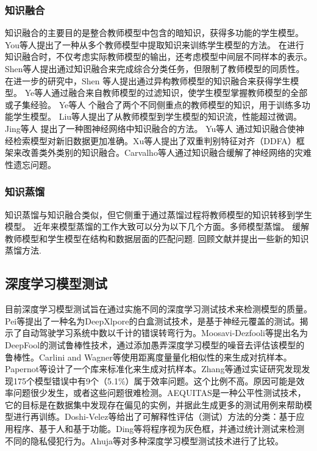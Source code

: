 \documentclass[fontset=macnew,UTF8]{article} %
\begin{document}
\subsubsection{知识融合}
知识融合的主要目的是整合教师模型中包含的暗知识，获得多功能的学生模型。 You等人\cite{you2017learning}提出了一种从多个教师模型中提取知识来训练学生模型的方法。 在进行知识融合时，不仅考虑实际教师模型的输出，还考虑模型中间层不同样本的表示。 Shen等人\cite{shen2019amalgamating}提出通过知识融合来完成综合分类任务，但限制了教师模型的同质性。 在进一步的研究中，Shen 等人\cite{shen2019customizing}提出通过异构教师模型的知识融合来获得学生模型。 Ye等人\cite{ye2019amalgamating}通过融合来自教师模型的过滤知识，使学生模型掌握教师模型的全部或子集经验。 Ye等人\cite{ye2019student} 个融合了两个不同侧重点的教师模型的知识，用于训练多功能学生模型。 Liu等人\cite{liu2019knowledge}提出了从教师模型到学生模型的知识流，性能超过微调。 Jing等人\cite{jing2021amalgamating} 提出了一种图神经网络中知识融合的方法。 Yu等人\cite{yu2022arm} 通过知识融合使神经检索模型对新旧数据更加准确。Xu等人\cite{xu2022hierarchical}提出了双重判别特征对齐（DDFA）框架来改善类外类别的知识融合。Carvalho等人\cite{de2022class}通过知识融合缓解了神经网络的灾难性遗忘问题。
\subsubsection{知识蒸馏}
知识蒸馏与知识融合类似，但它侧重于通过蒸馏过程将教师模型的知识转移到学生模型。 近年来模型蒸馏的工作大致可以分为以下几个方面。多师模型蒸馏\cite{zhao2020highlight,park2020feature}。 缓解教师模型和学生模型在结构和数据层面的匹配问题\cite{zhu2021student,mirzadeh2020improved,fang2021mosaicking}. 回顾文献\cite{wang2021knowledge,gou2021knowledge}并提出一些新的知识蒸馏方法\cite{li2022distilling,chen2022knowledge}.

\subsection{深度学习模型测试}
目前深度学习模型测试旨在通过实施不同的深度学习测试技术来检测模型的质量。Pei等\cite{pei2017deepxplore}提出了一种名为DeepXlpore的白盒测试技术，是基于神经元覆盖的测试。揭示了自动驾驶学习系统中数以千计的错误转弯行为。Moosavi-Dezfooli等\cite{moosavi2016deepfool}提出名为DeepFool的测试鲁棒性技术，通过添加愚弄深度学习模型的噪音去评估该模型的鲁棒性。Carlini and Wagner等\cite{carlini2017towards}使用距离度量量化相似性的来生成对抗样本。Papernot等\cite{goodfellow2016cleverhans,papernot2016technical}设计了一个库来标准化来生成对抗样本。Zhang等\cite{zhang2018empirical}通过实证研究发现发现175个模型错误中有9个（5.1\%）属于效率问题。这个比例不高。原因可能是效率问题很少发生，或者这些问题很难检测。AEQUITAS\cite{saleiro2018aequitas}是一种公平性测试技术，它的目标是在数据集中发现存在偏见的实例，并据此生成更多的测试用例来帮助模型进行再训练。Doshi-Velez等\cite{doshi2017towards}给出了可解释性评估（测试）方法的分类：基于应用程序、基于人和基于功能。Ding等\cite{ding2018detecting}将程序视为灰色框，并通过统计测试来检测不同的隐私侵犯行为。Ahuja等\cite{ahuja2022testing}对多种深度学习模型测试技术进行了比较。
\end{document}
